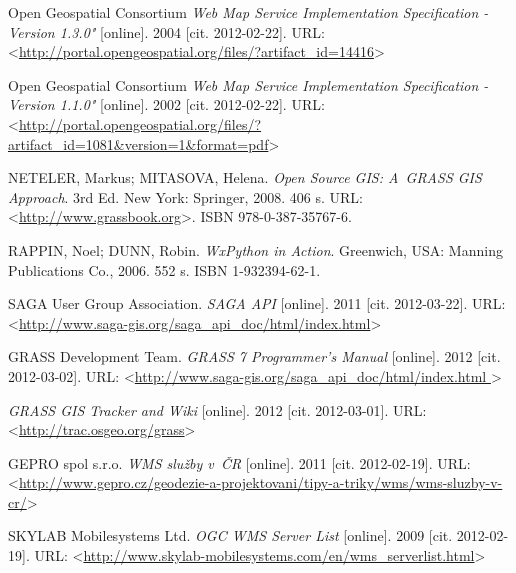 \documentclass[a4paper,12pt]{article}
\begin{document}
\begin{thebibliography}{99}
\label{literatura}


Open Geospatial Consortium
\textit{Web Map Service Implementation Specification - Version 1.3.0"} [online]. 2004  [cit. 2012-02-22].
URL:\textless\url{http://portal.opengeospatial.org/files/?artifact_id=14416}\textgreater


Open Geospatial Consortium
\textit{Web Map Service Implementation Specification - Version 1.1.0"} [online]. 2002  [cit. 2012-02-22].
URL:\textless\url{http://portal.opengeospatial.org/files/?artifact_id=1081&version=1&format=pdf}\textgreater


NETELER, Markus; MITASOVA, Helena. \textit{Open Source GIS:
A~GRASS GIS Approach}. 3rd Ed. New York: Springer, 2008. 406 s. URL:
\textless\url{http://www.grassbook.org}\textgreater. ISBN 978-0-387-35767-6.

RAPPIN, Noel; DUNN, Robin. \emph{WxPython in Action}. Greenwich, USA: Manning
Publications Co., 2006. 552 s. ISBN 1-932394-62-1.


SAGA User Group Association. \textit{SAGA API} [online].
2011 [cit. 2012-03-22].
URL: \textless\url{http://www.saga-gis.org/saga_api_doc/html/index.html}\textgreater

GRASS Development Team. \textit{GRASS 7 Programmer's Manual} [online].
2012 [cit. 2012-03-02].
URL: \textless\url{http://www.saga-gis.org/saga_api_doc/html/index.html
}\textgreater

\textit{GRASS GIS Tracker and Wiki} [online]. 2012 [cit. 2012-03-01].
URL: \textless\url{http://trac.osgeo.org/grass}\textgreater

GEPRO spol s.r.o. \textit{WMS služby v~ČR} [online].
2011 [cit. 2012-02-19].
URL: \textless\url{http://www.gepro.cz/geodezie-a-projektovani/tipy-a-triky/wms/wms-sluzby-v-cr/}\textgreater

SKYLAB Mobilesystems Ltd. \textit{OGC WMS Server List} [online].
2009 [cit. 2012-02-19].
URL: \textless\url{http://www.skylab-mobilesystems.com/en/wms_serverlist.html}\textgreater



\end{thebibliography}
\end{document}

